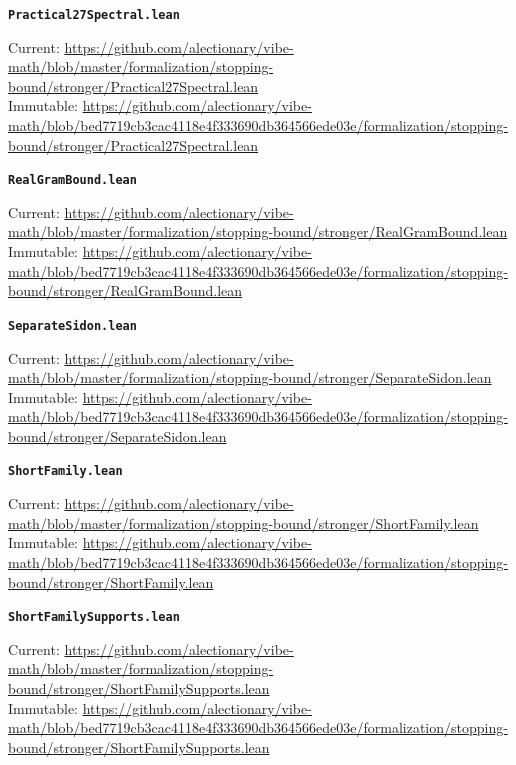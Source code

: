 \smallskip
\medskip
\par\noindent\textbf{\texttt{Practical27Spectral.lean}}\par\nopagebreak
{\footnotesize\noindent Current: \url{https://github.com/alectionary/vibe-math/blob/master/formalization/stopping-bound/stronger/Practical27Spectral.lean}\\
Immutable: \url{https://github.com/alectionary/vibe-math/blob/bed7719cb3cac4118e4f333690db364566ede03e/formalization/stopping-bound/stronger/Practical27Spectral.lean}\par}
\smallskip
\medskip
\par\noindent\textbf{\texttt{RealGramBound.lean}}\par\nopagebreak
{\footnotesize\noindent Current: \url{https://github.com/alectionary/vibe-math/blob/master/formalization/stopping-bound/stronger/RealGramBound.lean}\\
Immutable: \url{https://github.com/alectionary/vibe-math/blob/bed7719cb3cac4118e4f333690db364566ede03e/formalization/stopping-bound/stronger/RealGramBound.lean}\par}
\smallskip
\medskip
\par\noindent\textbf{\texttt{SeparateSidon.lean}}\par\nopagebreak
{\footnotesize\noindent Current: \url{https://github.com/alectionary/vibe-math/blob/master/formalization/stopping-bound/stronger/SeparateSidon.lean}\\
Immutable: \url{https://github.com/alectionary/vibe-math/blob/bed7719cb3cac4118e4f333690db364566ede03e/formalization/stopping-bound/stronger/SeparateSidon.lean}\par}
\smallskip
\medskip
\par\noindent\textbf{\texttt{ShortFamily.lean}}\par\nopagebreak
{\footnotesize\noindent Current: \url{https://github.com/alectionary/vibe-math/blob/master/formalization/stopping-bound/stronger/ShortFamily.lean}\\
Immutable: \url{https://github.com/alectionary/vibe-math/blob/bed7719cb3cac4118e4f333690db364566ede03e/formalization/stopping-bound/stronger/ShortFamily.lean}\par}
\smallskip
\medskip
\par\noindent\textbf{\texttt{ShortFamilySupports.lean}}\par\nopagebreak
{\footnotesize\noindent Current: \url{https://github.com/alectionary/vibe-math/blob/master/formalization/stopping-bound/stronger/ShortFamilySupports.lean}\\
Immutable: \url{https://github.com/alectionary/vibe-math/blob/bed7719cb3cac4118e4f333690db364566ede03e/formalization/stopping-bound/stronger/ShortFamilySupports.lean}\par}
